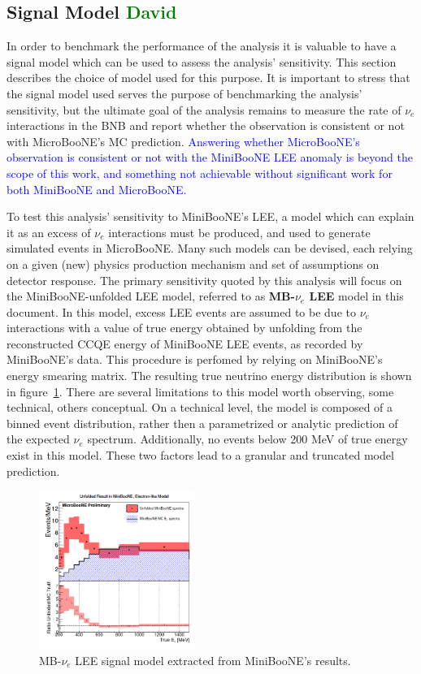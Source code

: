 \documentclass[a4paper]{article}
\begin{document}
\subsection{Signal Model \textcolor{green}{David}}
\par In order to benchmark the performance of the analysis it is valuable to have a signal model which can be used to assess the analysis' sensitivity.  This section describes the choice of model used for this purpose. It is important to stress that the signal model used serves the purpose of benchmarking the analysis' sensitivity, but the ultimate goal of the analysis remains to measure the rate of $\nu_e$ interactions in the BNB and report whether the observation is consistent or not with MicroBooNE's MC prediction. \textcolor{blue}{Answering whether MicroBooNE's observation is consistent or not with the MiniBooNE LEE anomaly is beyond the scope of this work, and something not achievable without significant work for both MiniBooNE and MicroBooNE.}
\par To test this analysis' sensitivity to MiniBooNE's LEE, a model which can explain it as an excess of $\nu_e$ interactions must be produced, and used to generate simulated events in MicroBooNE. Many such models can be devised, each relying on a given (new) physics production mechanism and set of assumptions on detector response. The primary sensitivity quoted by this analysis will focus on the MiniBooNE-unfolded LEE model, referred to as \textbf{MB-$\nu_e$ LEE} model in this document. In this model, excess LEE events are assumed to be due to $\nu_e$ interactions with a value of true energy obtained by unfolding from the reconstructed CCQE energy of MiniBooNE LEE events, as recorded by MiniBooNE's data. This procedure is perfomed by relying on MiniBooNE's energy smearing matrix. The resulting true neutrino energy distribution is shown in figure~\ref{fig:minibooneunfolded}. There are several limitations to this model worth observing, some technical, others conceptual. On a technical level, the model is composed of a binned event distribution, rather then a parametrized or analytic prediction of the expected $\nu_e$ spectrum. Additionally, no events below 200 MeV of true energy exist in this model. These two factors lead to a granular and truncated model prediction.
\begin{figure}[ht]
\begin{center}
\includegraphics[width=0.45\textwidth]{introduction/unfoldedminiboone.png}
\caption{\label{fig:minibooneunfolded}MB-$\nu_e$ LEE signal model extracted from MiniBooNE's results.}
\end{center}
\end{figure}
\end{document}
